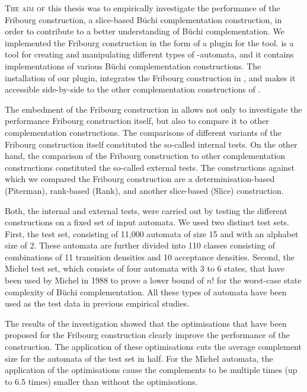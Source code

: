 \lettrine{T}{he aim of} this thesis was to empirically investigate the performance of the Fribourg construction, a slice-based Büchi complementation construction, in order to contribute to a better understanding of Büchi complementation. We implemented the Fribourg construction in the form of a plugin for the \goal{} tool. \goal{} is a tool for creating and manipulating different types of \om-automata, and it contains implementations of various Büchi complementation constructions. The installation of our plugin, integrates the Fribourg construction in \goal, and makes it accessible side-by-side to the other complementation constructions of \goal. 

The embedment of the Fribourg construction in \goal{} allows not only to investigate the performance Fribourg construction itself, but also to compare it to other complementation constructions. The comparisons of different variants of the Fribourg construction itself constituted the so-called internal tests. On the other hand, the comparison of the Fribourg construction to other complementation constructions constituted the so-called external tests. The constructions against which we compared the Fribourg construction are a determinisation-based (Piterman), rank-based (Rank), and another slice-based (Slice) construction.

Both, the internal and external tests, were carried out by testing the different constructions on a fixed set of input automata. We used two distinct test sets. First, the \goal{} test set, consisting of 11,000 automata of size 15 and with an alphabet size of 2. These automata are further divided into 110 classes consisting of combinations of 11 transition densities and 10 acceptance densities. Second, the Michel test set, which consists of four automata with 3 to 6 states, that have been used by Michel in 1988 to prove a lower bound of $n!$ for the worst-case state complexity of Büchi complementation. All these types of automata have been used as the test data in previous empirical studies.

The results of the investigation showed that the optimisations that have been proposed for the Fribourg construction clearly improve the performance of the construction. The application of these optimisations cuts the average complement size for the automata of the \goal{} test set in half. For the Michel automata, the application of the optimisations cause the complements to be multiple times (up to 6.5 times) smaller than without the optimisations.

